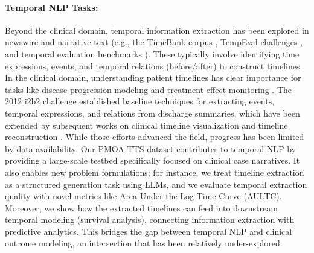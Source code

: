 \paragraph{Temporal NLP Tasks:} 
Beyond the clinical domain, temporal information extraction has been explored in newswire and narrative text (e.g., the TimeBank corpus \cite{pustejovsky2003timebank}, TempEval challenges \cite{verhagen2010semeval}, and temporal evaluation benchmarks \cite{chu2023timebench}).
These typically involve identifying time expressions, events, and temporal relations (before/after) to construct timelines.
In the clinical domain, understanding patient timelines has clear importance for tasks like disease progression modeling and treatment effect monitoring \cite{noroozizadeh2023temporal, belden2019designing}.
The 2012 i2b2 challenge \cite{sun2013evaluating} established baseline techniques for extracting events, temporal expressions, and relations from discharge summaries, which have been extended by subsequent works on clinical timeline visualization and timeline reconstruction \cite{moharasan2019extraction, leeuwenberg2020towards, frattallone2024using}.
While those efforts advanced the field, progress has been limited by data availability.
Our PMOA-TTS dataset contributes to temporal NLP by providing a large-scale testbed specifically focused on clinical case narratives.
It also enables new problem formulations; for instance, we treat timeline extraction as a structured generation task using LLMs, and we evaluate temporal extraction quality with novel metrics like Area Under the Log-Time Curve (AULTC).
Moreover, we show how the extracted timelines can feed into downstream temporal modeling (survival analysis), connecting information extraction with predictive analytics.
This bridges the gap between temporal NLP and clinical outcome modeling, an intersection that has been relatively under-explored.


